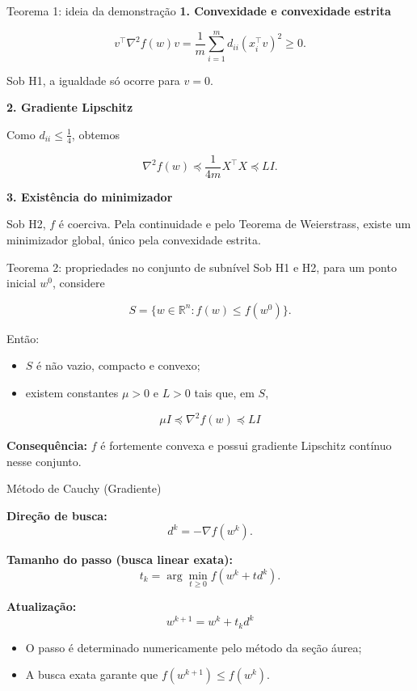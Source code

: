 \documentclass[aspectratio=169,11pt]{beamer}
\begin{document}
\begin{frame}{Teorema 1: ideia da demonstração}
\textbf{1. Convexidade e convexidade estrita}

\[
v^\top\nabla^2 f(w)v
=
\frac{1}{m}\sum_{i=1}^{m}
d_{ii}(x_i^\top v)^2\geq 0.
\]

Sob H1, a igualdade só ocorre para $v=0$.

\vspace{2mm}
\textbf{2. Gradiente Lipschitz}

Como $d_{ii}\leq \frac14$, obtemos

\[
\nabla^2 f(w)\preceq
\frac{1}{4m}X^\top X\preceq LI.
\]

\vspace{2mm}
\textbf{3. Existência do minimizador}

Sob H2, $f$ é coerciva. Pela continuidade e pelo Teorema de Weierstrass, existe um minimizador global, único pela convexidade estrita.
\end{frame}

\begin{frame}{Teorema 2: propriedades no conjunto de subnível}
Sob H1 e H2, para um ponto inicial $w^0$, considere

\[
S=\{w\in\mathbb{R}^n:f(w)\leq f(w^0)\}.
\]

Então:

\begin{itemize}
    \item $S$ é não vazio, compacto e convexo;
    \item existem constantes $\mu>0$ e $L>0$ tais que, em $S$,
\end{itemize}

\[
\boxed{
\mu I\preceq\nabla^2 f(w)\preceq LI
}
\]

\vspace{2mm}
\textbf{Consequência:} $f$ é fortemente convexa e possui gradiente Lipschitz contínuo nesse conjunto.
\end{frame}

\begin{frame}{Método de Cauchy (Gradiente)}

\textbf{Direção de busca:}
\[
d^k=-\nabla f(w^k).
\]

\textbf{Tamanho do passo (busca linear exata):}
\[
t_k=\arg\min_{t\geq0}f(w^k+td^k).
\]

\textbf{Atualização:}
\[
\boxed{w^{k+1}=w^k+t_kd^k}
\]

\begin{itemize}
    \item O passo é determinado numericamente pelo método da seção áurea;
    \item A busca exata garante que $f(w^{k+1})\leq f(w^k)$.
\end{itemize}

\end{frame}
\end{document}
